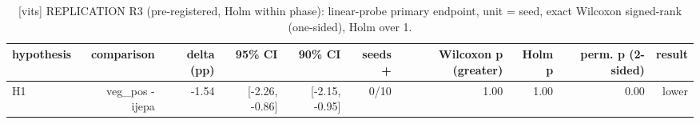 \begin{table}[t]
\centering
\small
\caption{[vits] REPLICATION R3 (pre-registered, Holm within phase): linear-probe primary endpoint, unit = seed, exact Wilcoxon signed-rank (one-sided), Holm over 1.}
\label{tab:primary_comparisons}
\begin{tabular}{lrrrrrrrrr}
\toprule
hypothesis & comparison & delta (pp) & 95\% CI & 90\% CI & seeds + & Wilcoxon p (greater) & Holm p & perm. p (2-sided) & result \\
\midrule
H1 & veg\_pos - ijepa & -1.54 & [-2.26, -0.86] & [-2.15, -0.95] & 0/10 & 1.00 & 1.00 & 0.00 & lower \\
\bottomrule
\end{tabular}
\end{table}
